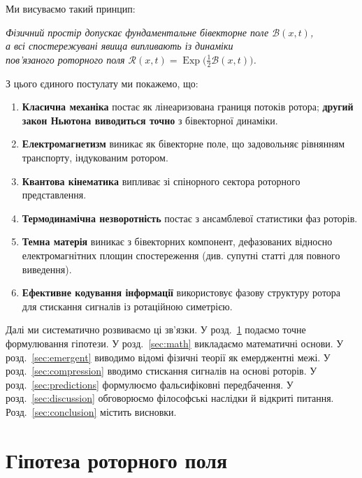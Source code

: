 \documentclass[11pt,a4paper]{article}
\newcommand{\Exp}{\operatorname{Exp}}
\newcommand{\Rotor}{\mathcal{R}}
\newcommand{\Biv}{\mathcal{B}}
\theoremstyle{definition}
\theoremstyle{plain}
\theoremstyle{remark}
\begin{document}
Ми висуваємо такий принцип:

\begin{center}
\textit{Фізичний простір допускає фундаментальне бівекторне поле $\Biv(x,t)$, \\
а всі спостережувані явища випливають із динаміки \\
пов’язаного роторного поля $\Rotor(x,t)=\Exp\!\big(\tfrac{1}{2}\Biv(x,t)\big)$.}
\end{center}

З цього єдиного постулату ми покажемо, що:

\begin{enumerate}[leftmargin=*,itemsep=3pt]
  \item \textbf{Класична механіка} постає як лінеаризована границя потоків ротора; \textbf{другий закон Ньютона виводиться точно} з бівекторної динаміки.
  \item \textbf{Електромагнетизм} виникає як бівекторне поле, що задовольняє рівнянням транспорту, індукованим ротором.
  \item \textbf{Квантова кінематика} випливає зі спінорного сектора роторного представлення.
  \item \textbf{Термодинамічна незворотність} постає з ансамблевої статистики фаз роторів.
  \item \textbf{Темна матерія} виникає з бівекторних компонент, дефазованих відносно електромагнітних площин спостереження (див. супутні статті для повного виведення).
  \item \textbf{Ефективне кодування інформації} використовує фазову структуру ротора для стискання сигналів із ротаційною симетрією.
\end{enumerate}

Далі ми систематично розвиваємо ці зв’язки. У розд.~\ref{sec:hypothesis} подаємо точне формулювання гіпотези. У розд.~\ref{sec:math} викладаємо математичні основи. У розд.~\ref{sec:emergent} виводимо відомі фізичні теорії як емерджентні межі. У розд.~\ref{sec:compression} вводимо стискання сигналів на основі роторів. У розд.~\ref{sec:predictions} формулюємо фальсифіковні передбачення. У розд.~\ref{sec:discussion} обговорюємо філософські наслідки й відкриті питання. Розд.~\ref{sec:conclusion} містить висновки.

\vspace{1em}

\section{Гіпотеза роторного поля}\label{sec:hypothesis}
\end{document}
